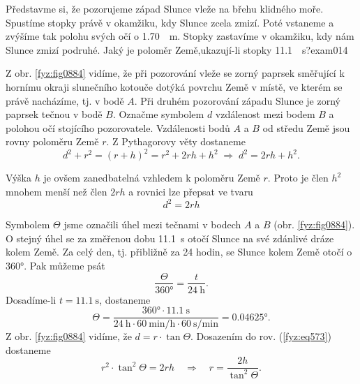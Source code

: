 \begin{fyzexam}{Představme si, že pozorujeme západ Slunce vleže na břehu klidného moře. Spustíme
  stopky právě v okamžiku, kdy Slunce zcela zmizí. Poté vstaneme a zvýšíme tak polohu svých očí o
  \protect\SI{1.70}{\protect\m}. Stopky zastavíme v okamžiku, kdy nám Slunce zmizí podruhé. Jaký je
  poloměr Země,ukazují-li stopky \protect\SI{11.1}{\protect\s}?}{exam014}

  {\centering
   \captionsetup{type=figure}
   \label{fyz:fig0885}
   \par
  }

  Z obr. \ref{fyz:fig0884} vidíme, že při pozorování vleže se zorný paprsek směřující k hornímu
  okraji slunečního kotouče dotýká povrchu Země v místě, ve kterém se právě nacházíme, tj. v bodě
  \(A\). Při druhém pozorování západu Slunce je zorný paprsek tečnou v bodě \(B\). Označme symbolem
  \(d\) vzdálenost mezi bodem \(B\) a polohou očí stojícího pozorovatele. Vzdálenosti bodů \(A\) a
  \(B\) od středu Země jsou rovny poloměru Země \(r\). Z Pythagorovy věty dostaneme
  \begin{equation*}
    d^2 + r^2 = (r + h)^2 = r^2 + 2rh + h^2\;\Rightarrow\; d^2 = 2rh + h^2.
  \end{equation*}

  Výška \(h\) je ovšem zanedbatelná vzhledem k poloměru Země \(r\). Proto je člen \(h^2\) mnohem
  menší než člen \(2rh\) a rovnici lze přepsat ve tvaru
  \begin{equation}\label{fyz:eq573}
    d^2 = 2rh
  \end{equation}

  Symbolem \(\varTheta\) jsme označili úhel mezi tečnami v bodech \(A\) a \(B\) (obr.
  \ref{fyz:fig0884}). O stejný úhel se za změřenou dobu \SI{11.1}{\s} otočí Slunce na své zdánlivé
  dráze kolem Země. Za celý den, tj. přibližně za \num{24} hodin, se Slunce kolem Země otočí o
  \ang{360}. Pak můžeme psát
  \begin{equation*}
    \dfrac{\varTheta}{\ang{360}} = \dfrac{t}{\SI{24}{\hour}}.
  \end{equation*}
  Dosadíme-li \(t = \SI{11.1}{\s}\), dostaneme
  \begin{equation*}
    \varTheta = \dfrac{\ang{360}\cdot\SI{11.1}{\s}}
                      {\SI{24}{\hour}\cdot\SI{60}{\minute\per\hour}\cdot\SI{60}{\s\per\minute}}
              =\ang{0.04625}.
  \end{equation*}
  Z obr. \ref{fyz:fig0884} vidíme, že \(d = r\cdot\tan{\varTheta}\). Dosazením do rov.
  (\ref{fyz:eq573}) dostaneme
  \begin{equation}\label{fyz:eq574}
    r^2\cdot\tan^2{\varTheta} = 2rh\quad\Rightarrow\quad 
    r = \dfrac{2h}{\tan^2{\varTheta}}.
  \end{equation}


\end{fyzexam}

